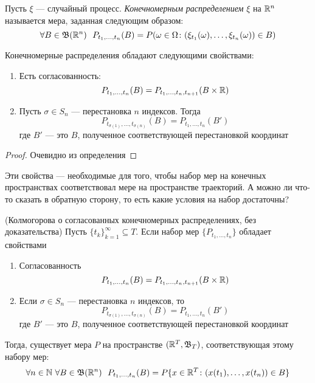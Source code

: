 \begin{definition}
	Пусть $\xi$ --- случайный процесс. \textit{Конечномерным распределением} $\xi$ на $\mathbb{R}^n$ называется мера, заданная следующим образом:
	\[
	\forall B \in \B(\R^n)\ \ P_{t_1, \ldots, t_n}(B) = P(\omega \in \Omega \colon (\xi_{t_1}(\omega), \ldots, \xi_{t_n}(\omega)) \in B)
	\]
\end{definition}

\begin{proposition}
	Конечномерные распределения обладают следующими свойствами:
	\begin{enumerate}
		\item Есть согласованность:
		\[
		P_{t_1, \ldots, t_n}(B) = P_{t_1, \ldots, t_n, t_{n + 1}}(B \times \mathbb{R})
		\]
		
		\item Пусть $\sigma \in S_n$ --- перестановка $n$ индексов. Тогда
		\[
		P_{t_{\sigma(1)}, \ldots, t_{\sigma(n)}}(B) = P_{t_1, \ldots, t_n}(B')
		\]
		где $B'$ --- это $B$, полученное соответствующей перестановкой координат
	\end{enumerate}
\end{proposition}

\begin{proof}
	Очевидно из определения
\end{proof}

\begin{note}
	Эти свойства --- необходимые для того, чтобы набор мер на конечных пространствах соответствовал мере на пространстве траекторий. А можно ли что-то сказать в обратную сторону, то есть какие условия на набор достаточны?
\end{note}

\begin{theorem} (Колмогорова о согласованных конечномерных распределениях, без доказательства)
	Пусть $\{t_k\}_{k = 1}^\infty \subseteq T$. Если набор мер $\{P_{t_1, \ldots, t_n}\}$ обладает свойствами
	\begin{enumerate}
		\item Согласованность
		\[
		P_{t_1, \ldots, t_n}(B) = P_{t_1, \ldots, t_n, t_{n + 1}}(B \times \mathbb{R})
		\]
		
		\item Если $\sigma \in S_n$ --- перестановка $n$ индексов, то
		\[
		P_{t_{\sigma(1)}, \ldots, t_{\sigma(n)}}(B) = P_{t_1, \ldots, t_n}(B')
		\]
		где $B'$ --- это $B$, полученное соответствующей перестановкой координат
	\end{enumerate}
	Тогда, существует мера $P$ на пространстве $(\mathbb{R}^T, \mathfrak{B}_T)$, соответствующая этому набору мер:
	\[
	\forall n \in \mathbb{N}\ \forall B \in \mathfrak{B}(\mathbb{R}^n)\ \ P_{t_1, \ldots, t_n}(B) = P\{x \in \mathbb{R}^T \colon (x(t_1), \ldots, x(t_n)) \in B\}
	\]
\end{theorem}

